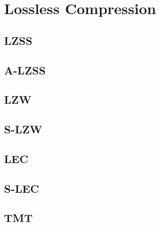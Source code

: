 \section{Lossless Compression}
\subsection{LZSS}
\subsection{A-LZSS}

\subsection{LZW}
\subsection{S-LZW}

\subsection{LEC}
\subsection{S-LEC}

\subsection{TMT}
